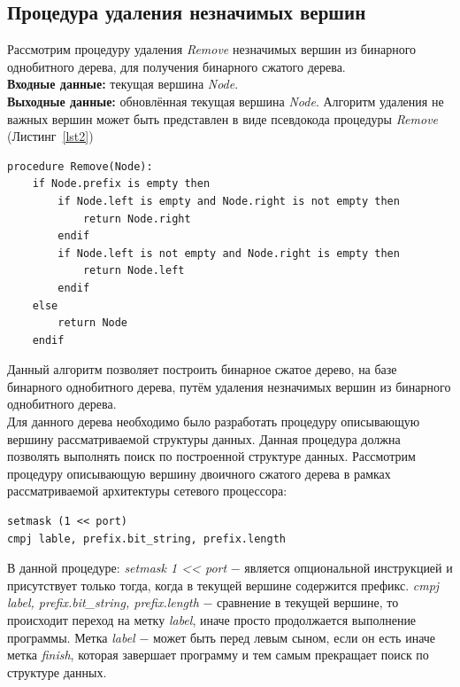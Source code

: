 \documentclass[a4paper, 12pt, titlepage, finall]{extreport}
\begin{document}
            \subsection{Процедура удаления незначимых вершин}
                Рассмотрим процедуру удаления \emph{Remove} незначимых вершин из бинарного однобитного дерева, для получения бинарного сжатого дерева.\\
                {\bf Входные данные:} текущая вершина \emph{Node}.\\
                {\bf Выходные данные:} обновлённая текущая вершина \emph{Node}.
                Алгоритм удаления не важных вершин может быть представлен в виде псевдокода процедуры \emph{Remove} (Листинг~\ref{lst2})
\\
\begin{center} 
\begin{lstlisting}[frame=lines, caption=Процедура удаления незначимых вершин., label=lst2]
procedure Remove(Node):
    if Node.prefix is empty then
        if Node.left is empty and Node.right is not empty then
            return Node.right
        endif
        if Node.left is not empty and Node.right is empty then
            return Node.left
        endif
    else
        return Node
    endif
\end{lstlisting}
\end{center}
\vspace{1em}
            Данный алгоритм позволяет построить бинарное сжатое дерево, на базе бинарного однобитного дерева, путём удаления незначимых вершин из бинарного однобитного дерева.\\
            Для данного дерева необходимо было разработать процедуру описывающую вершину рассматриваемой структуры данных. Данная процедура должна позволять выполнять
            поиск по построенной структуре данных.
            Рассмотрим процедуру описывающую вершину двоичного сжатого дерева в рамках рассматриваемой архитектуры сетевого процессора:
\\
\begin{lstlisting}[frame=lines, caption=Процедура описывающая вершину бинарном сжатом дереве.]
setmask (1 << port)
cmpj lable, prefix.bit_string, prefix.length
\end{lstlisting}
\vspace{1em}
            В данной процедуре: 
            \emph{setmask 1 << port} $-$ является опциональной инструкцией и присутствует только тогда, когда в текущей вершине содержится префикс.
            \emph{cmpj label, prefix.bit\_string, prefix.length} $-$ сравнение в текущей вершине, то происходит переход на метку \emph{label}, иначе просто продолжается выполнение программы.
            Метка \emph{label} $-$ может быть перед левым сыном, если он есть иначе метка \emph{finish}, 
            которая завершает программу и тем самым прекращает поиск по структуре данных.
\end{document}
